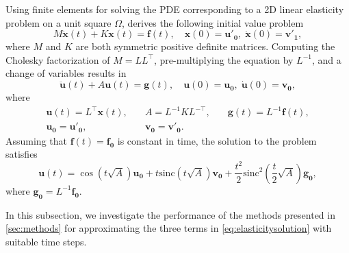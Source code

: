 Using finite elements for solving the PDE corresponding to a 2D linear elasticity problem
on a unit square $\Omega$,
\cite{voet2020linearelasticity} derives the following initial value problem
\begin{equation}
    \label{eq:elasticityequation}
    M \mathbf{\ddot{x}}(t) + K \mathbf{x}(t) = \mathbf{f}(t), \quad
    \mathbf{x}(0) = \mathbf{u'_0}, \; \mathbf{\dot{x}}(0) = \mathbf{v'_1},
\end{equation}
where $M$ and $K$ are both symmetric positive definite matrices.
Computing the Cholesky factorization of $M = LL^{\top}$, pre-multiplying the equation by $L^{-1}$,
and a change of variables results in
\begin{equation}
    \mathbf{\ddot{u}}(t) + A \mathbf{u}(t) = \mathbf{g}(t), \quad
    \mathbf{u}(0) = \mathbf{u_0}, \; \mathbf{\dot{u}}(0) = \mathbf{v_0},
\end{equation}
where
\begin{equation*}
    \begin{aligned}
        & \mathbf{u}(t) = L^{\top} \mathbf{x}(t), \quad & A = L^{-1} K L^{-\top}, \quad & \mathbf{g}(t) = L^{-1} \mathbf{f}(t), & \\
        & \mathbf{u_0} = \mathbf{u'_0}, & \mathbf{v_0} = \mathbf{v'_0}. & &
    \end{aligned}
\end{equation*}
Assuming that $\mathbf{f}(t) = \mathbf{f_0}$ is constant in time, the solution to
the problem satisfies
\begin{equation}
    \label{eq:elasticitysolution}
    \mathbf{u}(t) = \cos(t\sqrt{A}) \mathbf{u_0}
    + t \mathrm{sinc}(t\sqrt{A}) \mathbf{v_0}
    + \frac{t^2}{2} \mathrm{sinc}^2(\frac{t}{2} \sqrt{A}) \mathbf{g_0},
\end{equation}
where $\mathbf{g_0} = L^{-1} \mathbf{f_0}$.

In this subsection, we investigate the performance of the methods presented in \autoref{sec:methods}
for approximating the three terms in \eqref{eq:elasticitysolution} with suitable time steps.

